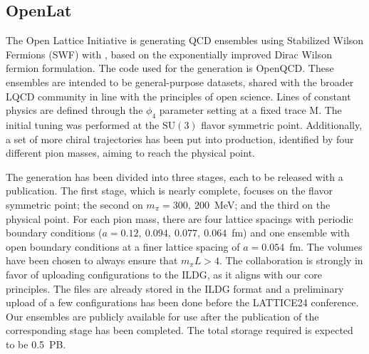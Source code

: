 \documentclass[a4paper,11pt]{article}
\begin{document}
\subsection{OpenLat}
The Open Lattice Initiative is generating QCD ensembles using
Stabilized Wilson Fermions (SWF) with \cite{Francis:2022hyr},
based on the exponentially improved Dirac Wilson fermion formulation.
The code used for the generation is OpenQCD\cite{openqcd}.  These
ensembles are intended to be general-purpose datasets, shared with the
broader LQCD community in line with the principles of open
science. Lines of constant physics are defined through the $\phi_4$
parameter setting at a fixed trace M. The initial tuning was performed
at the $\mathrm{SU}(3)$ flavor symmetric point.  Additionally, a set
of more chiral trajectories has been put into production, identified
by four different pion masses, aiming to reach the physical point.

The generation has been divided into three stages, each to be released
with a publication. The first stage, which is nearly complete, focuses
on the flavor symmetric point; the second on $m_\pi=300,~200$~MeV; and
the third on the physical point. For each pion mass, there are four
lattice spacings with periodic boundary conditions
($a=0.12,~0.094,~0.077,~0.064$~fm) and one ensemble with open boundary
conditions at a finer lattice spacing of $a=0.054$~fm.  The volumes
have been chosen to always ensure that $m_\pi L > 4$.  The
collaboration is strongly in favor of uploading configurations to the
ILDG, as it aligns with our core principles. The files are already
stored in the ILDG format and a preliminary upload of a few
configurations has been done before the LATTICE24 conference. Our
ensembles are publicly available for use after the publication of the
corresponding stage has been completed. The total storage required is
expected to be 0.5~PB.

\end{document}
